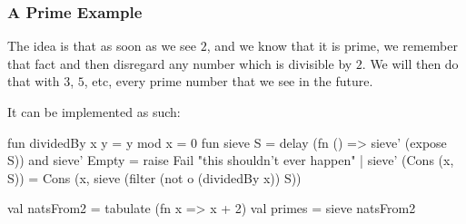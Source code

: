 \documentclass[aspectratio=169]{beamer}
\begin{document}
\begin{frame}[fragile]
  \frametitle{A Prime Example}

  \ptmt

  The idea is that as soon as we see $2$, and we know that it is prime, we remember
  that fact and then disregard any number which is divisible by $2$. We will then
  do that with $3$, $5$, etc, every prime number that we see in the future.

  \pause
  \vspace{\fill}

  It can be implemented as such:
  \begin{codeblock}
    fun dividedBy x y = y mod x = 0
    fun sieve  S = delay (fn () => sieve' (expose S))
    and sieve' Empty = raise Fail "this shouldn't ever happen"
      | sieve' (Cons (x, S)) =
          Cons (x, sieve (filter (not o (dividedBy x)) S))

    val natsFrom2 = tabulate (fn x => x + 2)
    val primes = sieve natsFrom2
  \end{codeblock}
\end{frame}



\thankyou
\end{document}
